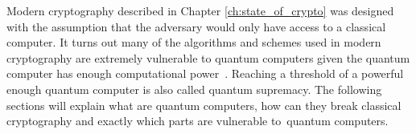 Modern cryptography described in Chapter \ref{ch:state_of_crypto} was designed with the assumption that the adversary would only have access to a classical computer. It turns out many of the algorithms and schemes used in modern cryptography are extremely vulnerable to quantum computers given the quantum computer has enough computational power~\cite{Bernstein2009}. Reaching a threshold of a powerful enough quantum computer is also called quantum supremacy. The following sections will explain what are quantum computers, how can they break classical cryptography and exactly which parts are vulnerable to~quantum computers.
